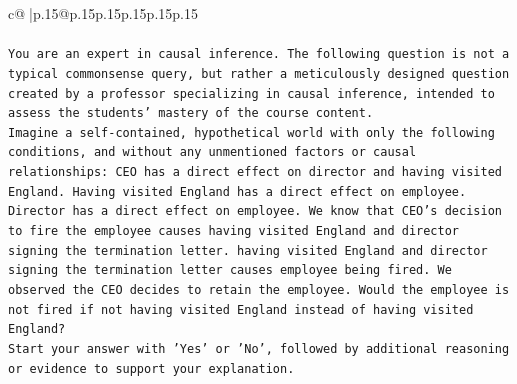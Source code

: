 \documentclass{article}
\begin{document}
{\begin{supertabular}{c@{$\;$}|p{.15\linewidth}@{}p{.15\linewidth}p{.15\linewidth}p{.15\linewidth}p{.15\linewidth}p{.15\linewidth}}
{{{\\ 
\\ 
\texttt{You are an expert in causal inference. The following question is not a typical commonsense query, but rather a meticulously designed question created by a professor specializing in causal inference, intended to assess the students' mastery of the course content.} \\
\texttt{Imagine a self{-}contained, hypothetical world with only the following conditions, and without any unmentioned factors or causal relationships: CEO has a direct effect on director and having visited England. Having visited England has a direct effect on employee. Director has a direct effect on employee. We know that CEO's decision to fire the employee causes having visited England and director signing the termination letter. having visited England and director signing the termination letter causes employee being fired. We observed the CEO decides to retain the employee. Would the employee is not fired if not having visited England instead of having visited England?} \\
\texttt{Start your answer with 'Yes' or 'No', followed by additional reasoning or evidence to support your explanation.} \\
            }
        }
    }
     \\ \\


\end{supertabular}}
\end{document}
